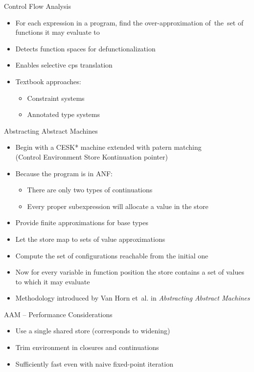 \documentclass[handout]{beamer}
\begin{document}
\begin{frame}{Control Flow Analysis}
  \begin{itemize}
    \item For each expression in a program, find the over-approximation of~the~set of functions it may evaluate to\pause
    \item Detects function spaces for defunctionalization\pause
    \item Enables selective cps translation
    \pause
    \item Textbook approaches:\pause
    \begin{itemize}
      \item Constraint systems\pause
      \item Annotated type systems
    \end{itemize}
  \end{itemize}
\end{frame}

\begin{frame}{Abstracting Abstract Machines}
  \begin{itemize}
    \item Begin with a CESK* machine extended with patern matching\\
      (Control Environment Store Kontinuation pointer)\pause
    \item Because the program is in ANF:\pause
    \begin{itemize}
      \item There are only two types of continuations\pause
      \item Every proper subexpression will allocate a value in the store
    \end{itemize}\pause
    \item Provide finite approximations for base types\pause
    \item Let the store map to sets of value approximations\pause
    \item Compute the set of configurations reachable from the initial one\pause
    \item Now for every variable in function position the store contains a set of values to which it may evaluate\pause
    \item Methodology introduced by Van Horn et~al. in \textit{Abstracting Abstract Machines}
  \end{itemize}
\end{frame}

\begin{frame}{AAM -- Performance Considerations}
  \begin{itemize}
    \item Use a single shared store (corresponds to widening)\pause
    \item Trim environment in closures and continuations\pause
    \item Sufficiently fast even with naive fixed-point iteration
  \end{itemize}
\end{frame}
\end{document}
